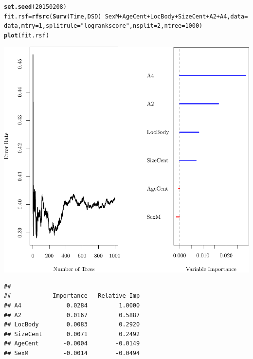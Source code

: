 \documentclass{article}\usepackage[]{graphicx}\usepackage[]{color}
\makeatletter
\def\maxwidth{ %
  \ifdim\Gin@nat@width>\linewidth
    \linewidth
  \else
    \Gin@nat@width
  \fi
}
\newcommand{\hlnum}[1]{\textcolor[rgb]{0.686,0.059,0.569}{#1}}%
\newcommand{\hlstr}[1]{\textcolor[rgb]{0.192,0.494,0.8}{#1}}%
\newcommand{\hlopt}[1]{\textcolor[rgb]{0,0,0}{#1}}%
\newcommand{\hlstd}[1]{\textcolor[rgb]{0.345,0.345,0.345}{#1}}%
\newcommand{\hlkwb}[1]{\textcolor[rgb]{0.69,0.353,0.396}{#1}}%
\newcommand{\hlkwc}[1]{\textcolor[rgb]{0.333,0.667,0.333}{#1}}%
\newcommand{\hlkwd}[1]{\textcolor[rgb]{0.737,0.353,0.396}{\textbf{#1}}}%
\newenvironment{kframe}{%
 \def\at@end@of@kframe{}%
 \ifinner\ifhmode%
  \def\at@end@of@kframe{\end{minipage}}%
  \begin{minipage}{\columnwidth}%
 \fi\fi%
 \def\FrameCommand##1{\hskip\@totalleftmargin \hskip-\fboxsep
 \colorbox{shadecolor}{##1}\hskip-\fboxsep
     \hskip-\linewidth \hskip-\@totalleftmargin \hskip\columnwidth}%
 \MakeFramed {\advance\hsize-\width
   \@totalleftmargin\z@ \linewidth\hsize
   \@setminipage}}%
 {\par\unskip\endMakeFramed%
 \at@end@of@kframe}
\newenvironment{knitrout}{}{} %
\makeatother
\begin{document}
\begin{knitrout}
\color{fgcolor}\begin{kframe}
\begin{alltt}
\hlkwd{set.seed}\hlstd{(}\hlnum{20150208}\hlstd{)}
\hlstd{fit.rsf} \hlkwb{=} \hlkwd{rfsrc}\hlstd{(}\hlkwd{Surv}\hlstd{(Time, DSD)} \hlopt{~} \hlstd{SexM} \hlopt{+} \hlstd{AgeCent} \hlopt{+} \hlstd{LocBody} \hlopt{+} \hlstd{SizeCent} \hlopt{+} \hlstd{A2} \hlopt{+} \hlstd{A4,} \hlkwc{data} \hlstd{= data,} \hlkwc{mtry} \hlstd{=} \hlnum{1}\hlstd{,} \hlkwc{splitrule} \hlstd{=} \hlstr{"logrankscore"}\hlstd{,} \hlkwc{nsplit} \hlstd{=} \hlnum{2}\hlstd{,} \hlkwc{ntree} \hlstd{=} \hlnum{1000}\hlstd{)}
\hlkwd{plot}\hlstd{(fit.rsf)}
\end{alltt}
\end{kframe}

{\centering \includegraphics[width=\maxwidth]{figure/05-final-fits-rsf-1} 

}


\begin{kframe}\begin{verbatim}
## 
##            Importance   Relative Imp
## A4             0.0284         1.0000
## A2             0.0167         0.5887
## LocBody        0.0083         0.2920
## SizeCent       0.0071         0.2492
## AgeCent       -0.0004        -0.0149
## SexM          -0.0014        -0.0494
\end{verbatim}
\end{kframe}
\end{knitrout}
\end{document}
